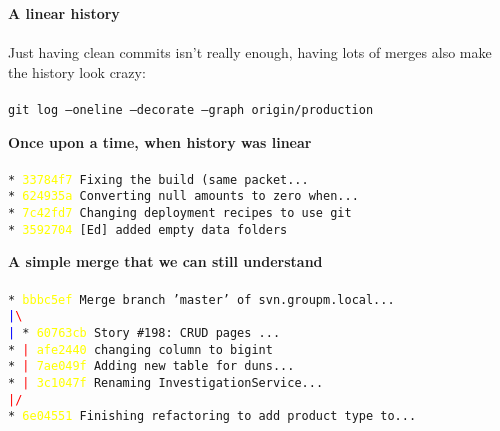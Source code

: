 \documentclass[landscape]{slides}
\begin{document}
\begin{slide}
\textbf{A linear history}\\
\\
Just having clean commits isn't really enough, having lots of merges also make
the history look crazy:\\
\\
\tt{git log --oneline --decorate --graph origin/production}
\end{slide}

\begin{slide}
\textbf{Once upon a time, when history was linear}\\
\\
\tt{* \textcolor{yellow}{33784f7} Fixing the build (same packet...}\\
\tt{* \textcolor{yellow}{624935a} Converting null amounts to zero when...}\\
\tt{* \textcolor{yellow}{7c42fd7} Changing deployment recipes to use git}\\
\tt{* \textcolor{yellow}{3592704} [Ed] added empty data folders}
\end{slide}

\begin{slide}
\textbf{A simple merge that we can still understand}\\
\\
\tt{*   \textcolor{yellow}{bbbc5ef} Merge branch 'master' of svn.groupm.local...}\\
\textcolor{blue}{\tt{|}}\textcolor{red}{\textbackslash}\\
\tt{\textcolor{blue}{|} * \textcolor{yellow}{60763cb} Story \#198: CRUD pages ...}\\
\tt{* \textcolor{red}{|} \textcolor{yellow}{afe2440} changing column to bigint}\\
\tt{* \textcolor{red}{|} \textcolor{yellow}{7ae049f} Adding new table for duns...}\\
\tt{* \textcolor{red}{|} \textcolor{yellow}{3c1047f} Renaming InvestigationService...}\\
\textcolor{red}{\tt{|/}}\\
\tt{* \textcolor{yellow}{6e04551} Finishing refactoring to add product type to...}\\
\end{slide}
\end{document}

